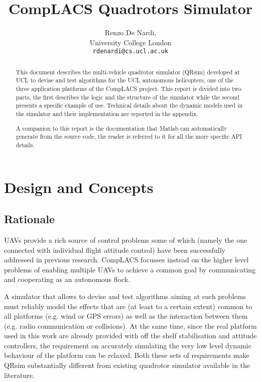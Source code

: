 \documentclass[a4paper,10pt]{report}
\title{{CompLACS} Quadrotors Simulator}
\author{Renzo De Nardi,\\University College London\\\texttt{rdenardi@cs.ucl.ac.uk}}
\newcommand{\sname}{QRsim\xspace}
\begin{document}
\maketitle

\begin{abstract}
This document describes the multi-vehicle quadrotor simulator (\sname) developed at UCL to devise and test algorithms for the UCL autonomous helicopters, one of the three application platforms of the {CompLACS} project.
This report is divided into two parts, the first describes the logic and the structure of the simulator while the second presents a specific example of use. 
Technical details about the dynamic models used in the simulator and their implementation are reported in the appendix. 

A companion to this report is the documentation that Matlab can automatically generate from the source code, the reader is referred to it for all the more specific API details.
\end{abstract}

\tableofcontents

\chapter{Design and Concepts}

\section{Rationale}
UAVs provide a rich source of control problems some of which (namely the one connected with individual flight attitude control) have been successfully addressed in previous research. {CompLACS} focusses instead on the higher level problems of enabling multiple UAVs to achieve a common goal by communicating and cooperating as an autonomous flock. 

A simulator that allows to devise and test algorithms aiming at such problems must reliably model the effects that are (at least to a certain extent) common to all platforms (e.g. wind or GPS errors) as well as the interaction between them (e.g. radio communication or collisions). 
At the same time, since the real platform used in this work are already provided with off the shelf stabilisation and attitude controllers, the requirement on accurately simulating the very low level dynamic behaviour of the platform can be relaxed.
Both these sets of requirements make \sname substantially different from existing quadrotor simulator available in the literature. 
\end{document}
